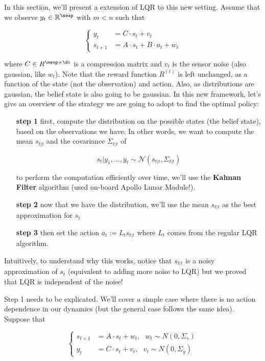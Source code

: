\documentclass{article}
\begin{document}
\vspace{1cm}

In this section, we'll present a extension of LQR to this new setting. Assume that we observe $ y_t \in \mathbb{R}^\nexp $ with $ m < n $ such that

\[ \begin{cases}
y_t &= C \cdot s_t + v_t\\
s_{t+1} &= A \cdot s_t + B \cdot a_t + w_t
\end{cases} \]

where $ C \in R^{\nexp \times \di} $ is a compression matrix and $ v_t $ is the sensor noise (also gaussian, like $ w_t $). Note that the reward function $ R^{(t)} $ is left unchanged, as a function of the state (not the observation) and action. Also, as distributions are gaussian, the belief state is also going to be gaussian. In this new framework, let's give an overview of the strategy we are going to adopt to find the optimal policy:

\begin{itemize}
\item[\textbf{step 1}] first, compute the distribution on the possible states (the belief state), based on the observations we have. In other words, we want to compute the mean $ s_{t|t} $ and the covariance $ \Sigma_{t|t} $ of 

\[ s_t | y_1, \dots, y_t  \sim \mathcal{N} \left( s_{t|t}, \Sigma_{t|t} \right)\]

to perform the computation efficiently over time, we'll use the \textbf{Kalman Filter} algorithm (used on-board Apollo Lunar Module!).
\item[\textbf{step 2}] now that we have the distribution, we'll use the mean $ s_{t|t} $ as the best approximation for $ s_t $
\item[\textbf{step 3}] then set the action $ a_t := L_t s_{t|t} $ where $ L_t $ comes from the regular LQR algorithm.
\end{itemize}

Intuitively, to understand why this works, notice that $ s_{t|t} $ is a noisy approximation of $ s_t $ (equivalent to adding more noise to LQR) but we proved that LQR is independent of the noise!

Step 1 needs to be explicated. We'll cover a simple case where there is no action dependence in our dynamics (but the general case follows the same idea). Suppose that 

\[ \begin{cases}
s_{t+1} &= A \cdot s_t + w_t, \ \ \ w_t \sim N(0, \Sigma_s)\\
y_t &= C \cdot s_t + v_t, \ \ \ v_t \sim N (0, \Sigma_y) 
\end{cases} \]
\end{document}
